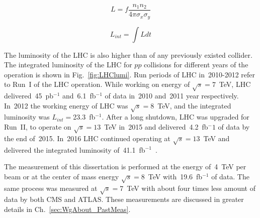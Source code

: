 \begin{equation}
L = f \frac{n_1 n_2}{4 \pi \sigma_x \sigma_y}
\end{equation}


\begin{equation}
L_{int}=\int L dt
\end{equation}


The luminosity of the LHC is also higher than of any previously existed collider. The integrated luminosity of the LHC for $pp$ collisions for different years of the operation is shown in Fig.~\ref{fig:LHClumi}. Run periods of LHC in~2010-2012 refer to Run~I of the LHC operation. While working on energy of $\sqrt{s}=7$~TeV, LHC delivered~45~pb$^{-1}$ and~6.1~fb$^{-1}$ of data in~2010 and~2011 year respectively. In~2012 the working energy of LHC was $\sqrt{s}=8$~TeV, and the integrated luminosity was $L_{int}=$23.3~fb$^{-1}$.  After a long shutdown, LHC was upgraded for Run~II, to operate on $\sqrt{s}=13$~TeV in~2015 and delivered~4.2~fb$^-1$ of data by the end of~2015. In~2016 LHC continued operating at $\sqrt{s}=13$~TeV and delivered the integrated luminosity of~41.1~fb$^{-1}$~\cite{ref_LHClumi_twiki}.

The measurement of this dissertation is performed at the energy of~4~TeV per beam or at the center of mass energy $\sqrt{s}=8$~TeV with~19.6~fb$^{-1}$ of data. The same process was measured at $\sqrt{s}=7$~TeV with about four times less amount of data by both CMS and ATLAS. These measurements are discussed in greater details in Ch.~\ref{sec:WgAbout_PastMeas}.

